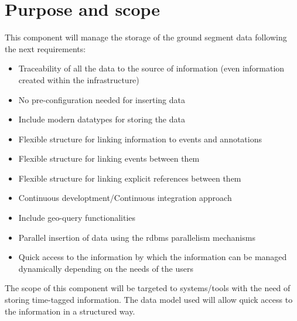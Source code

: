 \chapter{Purpose and scope}

This component will manage the storage of the ground segment data following the next requirements:

\begin{itemize} 

\item Traceability of all the data to the source of information (even information created within the infrastructure)

\item No pre-configuration needed for inserting data

\item Include modern datatypes for storing the data

\item Flexible structure for linking information to events and annotations

\item Flexible structure for linking events between them

\item Flexible structure for linking explicit references between them

\item Continuous developtment/Continuous integration approach

\item Include geo-query functionalities

\item Parallel insertion of data using the \acrshort{rdbms} parallelism mechanisms

\item Quick access to the information by which the information can be managed dynamically depending on the needs of the users

\end{itemize}

The scope of this component will be targeted to systems/tools with the need of storing time-tagged information. The data model used will allow quick access to the information in a structured way.